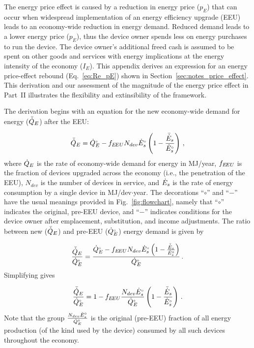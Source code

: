 

The energy price effect is caused by a reduction 
in energy price ($p_E$)
that can occur when widespread implementation 
of an energy efficiency upgrade (EEU)
leads to an economy-wide reduction in energy demand.
Reduced demand leads to a lower energy price ($p_E$), 
thus the device owner spends less on energy purchases
to run the device.
The device owner's additional freed cash
is assumed to be spent on other goods and services
with energy implications 
at the energy intensity of the economy ($I_E$).
This appendix derives an expression for an
energy price-effect rebound (Eq.~\ref{eq:Re_pE})
shown in Section~\ref{sec:notes_price_effect}.
This derivation and our assessment of the magnitude of the energy price effect
in Part~II
illustrates the flexibility and extinsibility of the framework.

The derivation begins with an equation for the new economy-wide 
demand for energy ($\bar{\dot{Q}}_E$) after the EEU:

\begin{equation}
  \bar{\dot{Q}}_E = {}{\dot{Q}}^{\scriptscriptstyle \circ}_E - f_{E\!EU} N_{dev} {}{\dot{E}}^{\scriptscriptstyle \circ}_s \left( 1 - \frac{\bar{\dot{E}}_s}{{}{\dot{E}}^{\scriptscriptstyle \circ}_s} \right) \, ,
\end{equation}
%
where
$\dot{Q}_E$ is the rate of economy-wide demand for energy in MJ/year,
$f_{E\!EU}$ is the fraction of devices upgraded across the economy
(i.e., the penetration of the EEU),
$N_{dev}$ is the number of devices in service, and
$\dot{E}_s$ is the rate of energy consumption by a single device in MJ/dev$\cdot$year.
The decorations ``$\circ$'' and ``$-$'' have the usual meanings
provided in Fig.~\ref{fig:flowchart}, namely that
``$\circ$'' indicates the original, pre-EEU device, and
``$-$'' indicates conditions for the device owner after
emplacement, substitution, and income
adjustments.
The ratio between
new ($\bar{\dot{Q}}_E$) and
pre-EEU (${}{\dot{Q}}^{\scriptscriptstyle \circ}_E$)
energy demand is given by

\begin{equation}
  \frac{\bar{\dot{Q}}_E}{{}{\dot{Q}}^{\scriptscriptstyle \circ}_E} =
        \frac{{}{\dot{Q}}^{\scriptscriptstyle \circ}_E - f_{E\!EU} N_{dev} {}{\dot{E}}^{\scriptscriptstyle \circ}_s \left( 1 - \frac{\bar{\dot{E}}_s}{{}{\dot{E}}^{\scriptscriptstyle \circ}_s}  \right)}
        {{}{\dot{Q}}^{\scriptscriptstyle \circ}_E} \, .
\end{equation}
%
Simplifying gives

\begin{equation} \label{eq:QE_ratio}
  \frac{\bar{\dot{Q}}_E}{{}{\dot{Q}}^{\scriptscriptstyle \circ}_E} =
        1 - f_{E\!EU} \frac{N_{dev} {}{\dot{E}}^{\scriptscriptstyle \circ}_s}{{}{\dot{Q}}^{\scriptscriptstyle \circ}_E} \left( 1 - \frac{\bar{\dot{E}}_s}{{}{\dot{E}}^{\scriptscriptstyle \circ}_s}  \right) \, .
\end{equation}
%
Note that the group $\frac{N_{dev} {}{\dot{E}}^{\scriptscriptstyle \circ}_s}{{}{\dot{Q}}^{\scriptscriptstyle \circ}_E}$
is the original (pre-EEU) fraction of all energy production
(of the kind used by the device)
consumed by all such devices throughout the economy.

